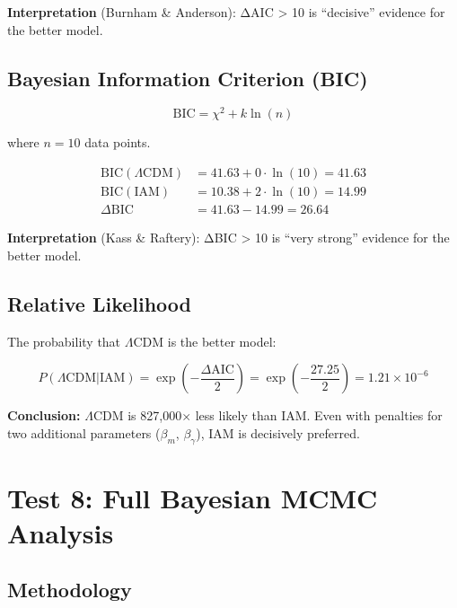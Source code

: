 \documentclass[11pt,letterpaper]{article}
\begin{document}
\noindent\textbf{Interpretation} (Burnham \& Anderson): ΔAIC > 10 is ``decisive'' evidence for the better model.

\subsection{Bayesian Information Criterion (BIC)}

\begin{equation}
\text{BIC} = \chi^2 + k \ln(n)
\end{equation}

where $n = 10$ data points.

\begin{align*}
\text{BIC}(\Lambda\text{CDM}) &= 41.63 + 0 \cdot \ln(10) = 41.63 \\
\text{BIC}(\text{IAM}) &= 10.38 + 2 \cdot \ln(10) = 14.99 \\
\Delta\text{BIC} &= 41.63 - 14.99 = 26.64
\end{align*}

\noindent\textbf{Interpretation} (Kass \& Raftery): ΔBIC > 10 is ``very strong'' evidence for the better model.

\subsection{Relative Likelihood}

The probability that $\Lambda$CDM is the better model:

\begin{equation}
P(\Lambda\text{CDM} | \text{IAM}) = \exp\left(-\frac{\Delta\text{AIC}}{2}\right) = \exp\left(-\frac{27.25}{2}\right) = 1.21 \times 10^{-6}
\end{equation}

\noindent\textbf{Conclusion:} $\Lambda$CDM is 827,000$\times$ less likely than IAM. Even with penalties for two additional parameters ($\beta_m$, $\beta_\gamma$), IAM is decisively preferred.

\section{Test 8: Full Bayesian MCMC Analysis}

\subsection{Methodology}
\end{document}
